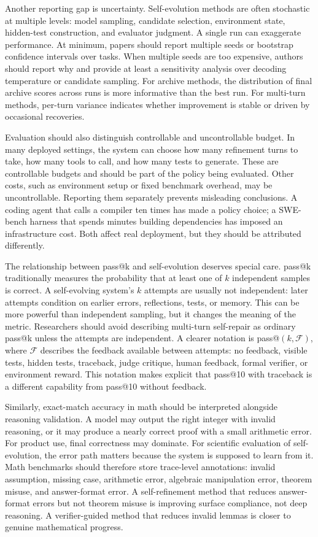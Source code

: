 Another reporting gap is uncertainty. Self-evolution methods are often stochastic at multiple levels: model sampling, candidate selection, environment state, hidden-test construction, and evaluator judgment. A single run can exaggerate performance. At minimum, papers should report multiple seeds or bootstrap confidence intervals over tasks. When multiple seeds are too expensive, authors should report why and provide at least a sensitivity analysis over decoding temperature or candidate sampling. For archive methods, the distribution of final archive scores across runs is more informative than the best run. For multi-turn methods, per-turn variance indicates whether improvement is stable or driven by occasional recoveries.

Evaluation should also distinguish controllable and uncontrollable budget. In many deployed settings, the system can choose how many refinement turns to take, how many tools to call, and how many tests to generate. These are controllable budgets and should be part of the policy being evaluated. Other costs, such as environment setup or fixed benchmark overhead, may be uncontrollable. Reporting them separately prevents misleading conclusions. A coding agent that calls a compiler ten times has made a policy choice; a SWE-bench harness that spends minutes building dependencies has imposed an infrastructure cost. Both affect real deployment, but they should be attributed differently.

The relationship between pass@k and self-evolution deserves special care. pass@k traditionally measures the probability that at least one of $k$ independent samples is correct. A self-evolving system's $k$ attempts are usually not independent: later attempts condition on earlier errors, reflections, tests, or memory. This can be more powerful than independent sampling, but it changes the meaning of the metric. Researchers should avoid describing multi-turn self-repair as ordinary pass@k unless the attempts are independent. A clearer notation is pass@$(k,\mathcal{F})$, where $\mathcal{F}$ describes the feedback available between attempts: no feedback, visible tests, hidden tests, traceback, judge critique, human feedback, formal verifier, or environment reward. This notation makes explicit that pass@10 with traceback is a different capability from pass@10 without feedback.

Similarly, exact-match accuracy in math should be interpreted alongside reasoning validation. A model may output the right integer with invalid reasoning, or it may produce a nearly correct proof with a small arithmetic error. For product use, final correctness may dominate. For scientific evaluation of self-evolution, the error path matters because the system is supposed to learn from it. Math benchmarks should therefore store trace-level annotations: invalid assumption, missing case, arithmetic error, algebraic manipulation error, theorem misuse, and answer-format error. A self-refinement method that reduces answer-format errors but not theorem misuse is improving surface compliance, not deep reasoning. A verifier-guided method that reduces invalid lemmas is closer to genuine mathematical progress.

